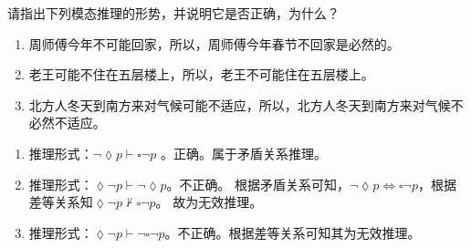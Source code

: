 \documentclass{ctexart}
\begin{document}
\begin{problem}\label{pro:4}
  请指出下列模态推理的形势，并说明它是否正确，为什么？
  \begin{enumerate}
    \item 周师傅今年不可能回家，所以，周师傅今年春节不回家是必然的。
    \item 老王可能不住在五层楼上，所以，老王不可能住在五层楼上。
    \item 北方人冬天到南方来对气候可能不适应，所以，北方人冬天到南方来对气候不必然不适应。
  \end{enumerate}
\end{problem}
\begin{solution}
  \begin{enumerate}
    \item 推理形式：\(\neg \lozenge p \vdash \square \neg p\) 。正确。属于矛盾关系推理。
    \item 推理形式：\(\lozenge \neg p \vdash \neg \lozenge p\)。不正确。
      根据矛盾关系可知，\(\neg \lozenge p \iff \square \neg p\)，根据差等关系知\(\lozenge \neg p \not \vdash \square \neg p\)。
      故为无效推理。
    \item 推理形式：\(\lozenge \neg p \vdash \neg \square \neg p \)。不正确。根据差等关系可知其为无效推理。
  \end{enumerate}
\end{solution}
\end{document}
